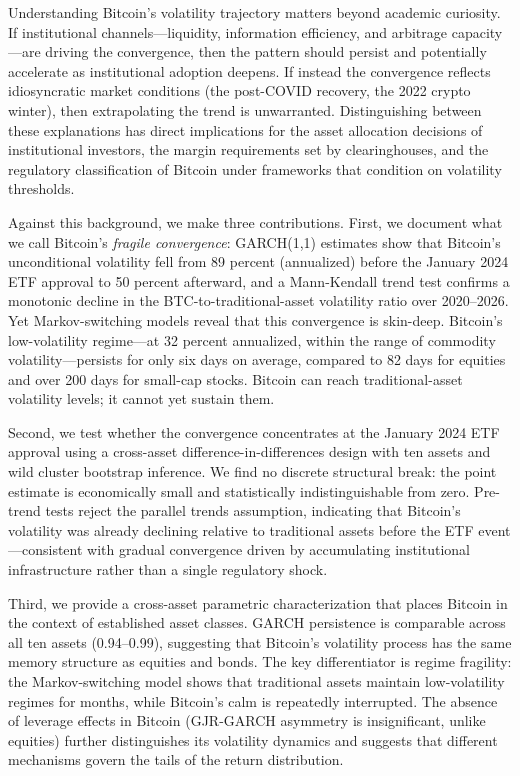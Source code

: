\documentclass[12pt,a4paper]{article}
\begin{document}
Understanding Bitcoin's volatility trajectory matters beyond academic
curiosity. If institutional channels---liquidity, information efficiency,
and arbitrage capacity---are driving the convergence, then the pattern
should persist and potentially accelerate as institutional adoption
deepens. If instead the convergence reflects idiosyncratic market
conditions (the post-COVID recovery, the 2022 crypto winter), then
extrapolating the trend is unwarranted. Distinguishing between these
explanations has direct implications for the asset allocation decisions of
institutional investors, the margin requirements set by clearinghouses, and
the regulatory classification of Bitcoin under frameworks that condition on
volatility thresholds.

Against this background, we make three contributions. First, we document
what we call Bitcoin's \emph{fragile convergence}: GARCH(1,1) estimates
show that Bitcoin's unconditional volatility fell from 89 percent
(annualized) before the January 2024 ETF approval to 50 percent afterward,
and a Mann-Kendall trend test confirms a monotonic decline in the
BTC-to-traditional-asset volatility ratio over 2020--2026. Yet
Markov-switching models reveal that this convergence is skin-deep.
Bitcoin's low-volatility regime---at 32 percent annualized, within the
range of commodity volatility---persists for only six days on average,
compared to 82 days for equities and over 200 days for small-cap stocks.
Bitcoin can reach traditional-asset volatility levels; it cannot yet
sustain them.

Second, we test whether the convergence concentrates at the January 2024
ETF approval using a cross-asset difference-in-differences design with ten
assets and wild cluster bootstrap inference. We find no discrete structural
break: the point estimate is economically small and statistically
indistinguishable from zero. Pre-trend tests reject the parallel trends
assumption, indicating that Bitcoin's volatility was already declining
relative to traditional assets before the ETF event---consistent with
gradual convergence driven by accumulating institutional infrastructure
rather than a single regulatory shock.

Third, we provide a cross-asset parametric characterization that places
Bitcoin in the context of established asset classes. GARCH persistence is
comparable across all ten assets (0.94--0.99), suggesting that Bitcoin's
volatility process has the same memory structure as equities and bonds. The
key differentiator is regime fragility: the Markov-switching model shows
that traditional assets maintain low-volatility regimes for months, while
Bitcoin's calm is repeatedly interrupted. The absence of leverage effects
in Bitcoin (GJR-GARCH asymmetry is insignificant, unlike equities) further
distinguishes its volatility dynamics and suggests that different
mechanisms govern the tails of the return distribution.
\end{document}
